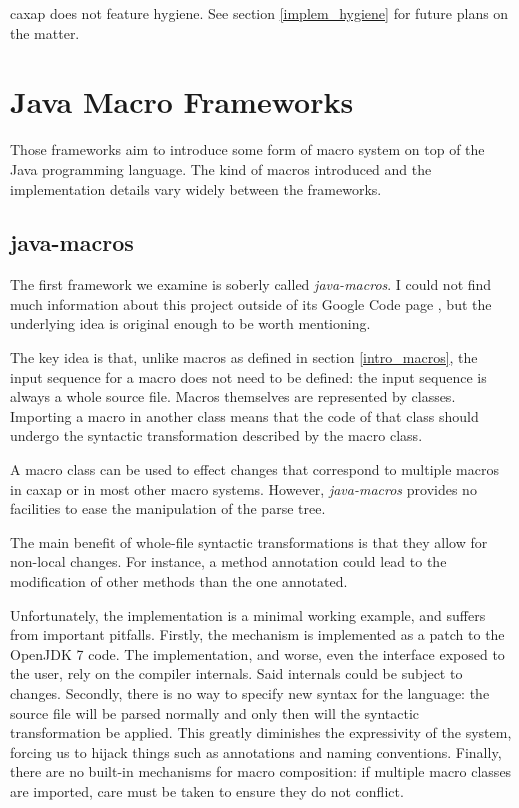 caxap does not feature hygiene. See section \ref{implem_hygiene} for future
plans on the matter.

\section{Java Macro Frameworks}

Those frameworks aim to introduce some form of macro system on top of the Java
programming language. The kind of macros introduced and the implementation
details vary widely between the frameworks.

\subsection{java-macros}

The first framework we examine is soberly called \emph{java-macros}. I could not
find much information about this project outside of its Google Code page
\cite{java_macros}, but the underlying idea is original enough to be worth
mentioning.

The key idea is that, unlike macros as defined in section \ref{intro_macros},
the input sequence for a macro does not need to be defined: the input sequence
is always a whole source file. Macros themselves are represented by
classes. Importing a macro in another class means that the code of that class
should undergo the syntactic transformation described by the macro class.

A macro class can be used to effect changes that correspond to multiple macros
in caxap or in most other macro systems. However, \emph{java-macros} provides no
facilities to ease the manipulation of the parse tree.

The main benefit of whole-file syntactic transformations is that they allow for
non-local changes. For instance, a method annotation could lead to the
modification of other methods than the one annotated.

Unfortunately, the implementation is a minimal working example, and suffers from
important pitfalls. Firstly, the mechanism is implemented as a patch to the
OpenJDK 7 code. The implementation, and worse, even the interface exposed to the
user, rely on the compiler internals. Said internals could be subject to
changes. Secondly, there is no way to specify new syntax for the language: the
source file will be parsed normally and only then will the syntactic
transformation be applied. This greatly diminishes the expressivity of the
system, forcing us to hijack things such as annotations and naming conventions.
Finally, there are no built-in mechanisms for macro composition: if multiple
macro classes are imported, care must be taken to ensure they do not conflict.

